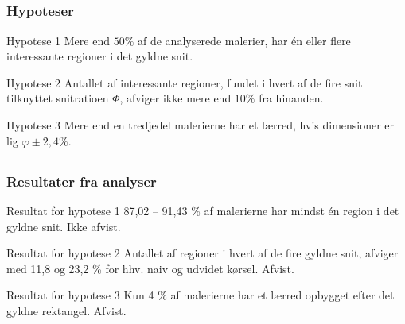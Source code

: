 \documentclass[xcolor=table]{beamer}
\begin{document}
\subsection*{}
\begin{frame}

    \frametitle{Hypoteser}

    \begin{block}{Hypotese 1}
        Mere end $50\%$ af de analyserede malerier, har én eller flere
        interessante regioner i det gyldne snit.
    \end{block}

    \begin{block}{Hypotese 2}
        Antallet af interessante regioner, fundet i hvert af de fire snit
        tilknyttet snitratioen $\varPhi$, afviger ikke mere end $10\%$ fra
        hinanden.
    \end{block}

    \begin{block}{Hypotese 3}
        Mere end en tredjedel malerierne har et lærred, hvis
        dimensioner er lig $\varphi\pm2,4\%$.
    \end{block}

\end{frame}

\subsection*{}
\begin{frame}

    \frametitle{Resultater fra analyser}

    \begin{block}{Resultat for hypotese 1}
        87,02 -- 91,43 \% af malerierne har mindst én region i det gyldne snit.
        \alert{Ikke afvist.}
    \end{block}

    \begin{block}{Resultat for hypotese 2}
        Antallet af regioner i hvert af de fire gyldne snit, afviger med 11,8 og 23,2 \% for hhv. naiv og udvidet kørsel.
        \alert{Afvist.}
    \end{block}

    \begin{block}{Resultat for hypotese 3}
        Kun 4 \% af malerierne har et lærred opbygget efter det gyldne rektangel.
        \alert{Afvist.}
    \end{block}

\end{frame}
\end{document}
